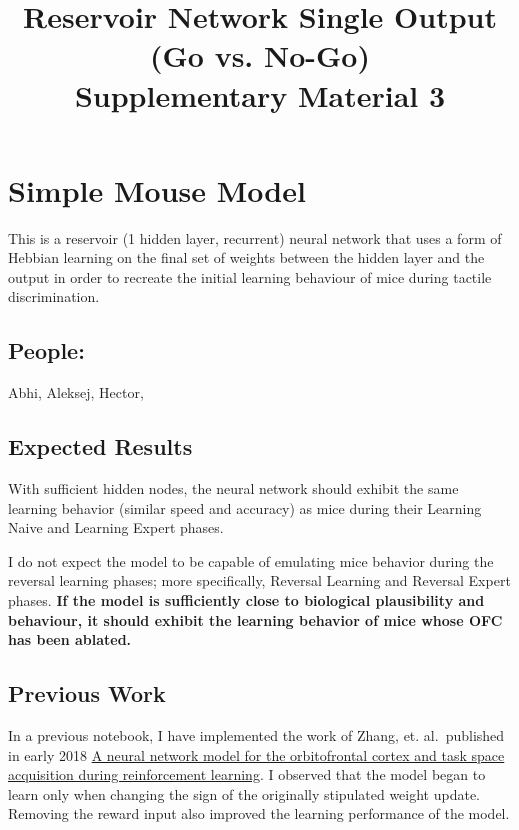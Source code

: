 \documentclass[11pt]{article}
\title{Reservoir Network Single Output (Go vs. No-Go) \\ Supplementary Material 3}
\begin{document}
    
    
    \maketitle
    
    

    
    \hypertarget{simple-mouse-model}{%
\section{Simple Mouse Model}\label{simple-mouse-model}}

This is a reservoir (1 hidden layer, recurrent) neural network that uses
a form of Hebbian learning on the final set of weights between the
hidden layer and the output in order to recreate the initial learning
behaviour of mice during tactile discrimination.

\hypertarget{people}{%
\subsection{People:}\label{people}}

Abhi, Aleksej, Hector,

\hypertarget{expected-results}{%
\subsection{Expected Results}\label{expected-results}}

With sufficient hidden nodes, the neural network should exhibit the same
learning behavior (similar speed and accuracy) as mice during their
Learning Naive and Learning Expert phases.

I do not expect the model to be capable of emulating mice behavior
during the reversal learning phases; more specifically, Reversal
Learning and Reversal Expert phases. \textbf{If the model is
sufficiently close to biological plausibility and behaviour, it should
exhibit the learning behavior of mice whose OFC has been ablated.}

\hypertarget{previous-work}{%
\subsection{Previous Work}\label{previous-work}}

In a previous notebook, I have implemented the work of Zhang, et.
al.~published in early 2018
\href{https://journals.plos.org/ploscompbiol/article/file?id=10.1371/journal.pcbi.1005925\&type=printable}{A
neural network model for the orbitofrontal cortex and task space
acquisition during reinforcement learning}. I observed that the model
began to learn only when changing the sign of the originally stipulated
weight update. Removing the reward input also improved the learning
performance of the model.
\end{document}
